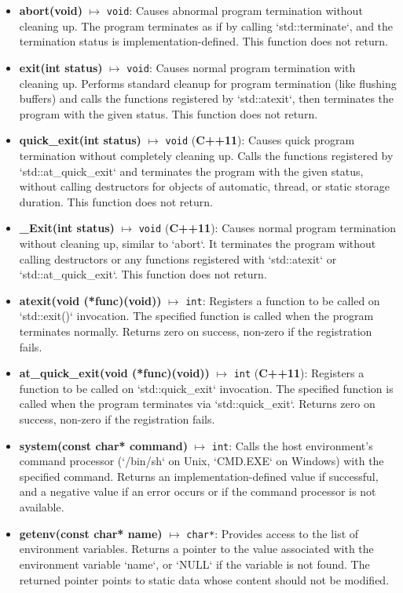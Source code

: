 \documentclass{report}
\begin{document}
    \begin{itemize}
        \item \textbf{abort(void)} $\mapsto$ \texttt{void}: Causes abnormal program termination without cleaning up. The program terminates as if by calling `std::terminate`, and the termination status is implementation-defined. This function does not return.
        \item \textbf{exit(int status)} $\mapsto$ \texttt{void}: Causes normal program termination with cleaning up. Performs standard cleanup for program termination (like flushing buffers) and calls the functions registered by `std::atexit`, then terminates the program with the given status. This function does not return.
        \item \textbf{quick\_exit(int status)} $\mapsto$ \texttt{void} (\textbf{C++11}): Causes quick program termination without completely cleaning up. Calls the functions registered by `std::at\_quick\_exit` and terminates the program with the given status, without calling destructors for objects of automatic, thread, or static storage duration. This function does not return.
        \item \textbf{\_Exit(int status)} $\mapsto$ \texttt{void} (\textbf{C++11}): Causes normal program termination without cleaning up, similar to `abort`. It terminates the program without calling destructors or any functions registered with `std::atexit` or `std::at\_quick\_exit`. This function does not return.
        \item \textbf{atexit(void (*func)(void))} $\mapsto$ \texttt{int}: Registers a function to be called on `std::exit()` invocation. The specified function is called when the program terminates normally. Returns zero on success, non-zero if the registration fails.
        \item \textbf{at\_quick\_exit(void (*func)(void))} $\mapsto$ \texttt{int} (\textbf{C++11}): Registers a function to be called on `std::quick\_exit` invocation. The specified function is called when the program terminates via `std::quick\_exit`. Returns zero on success, non-zero if the registration fails.
        \item \textbf{system(const char* command)} $\mapsto$ \texttt{int}: Calls the host environment's command processor (`/bin/sh` on Unix, `CMD.EXE` on Windows) with the specified command. Returns an implementation-defined value if successful, and a negative value if an error occurs or if the command processor is not available.
        \item \textbf{getenv(const char* name)} $\mapsto$ \texttt{char*}: Provides access to the list of environment variables. Returns a pointer to the value associated with the environment variable `name`, or `NULL` if the variable is not found. The returned pointer points to static data whose content should not be modified.
    \end{itemize}
\end{document}

